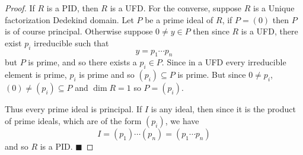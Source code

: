 \documentclass[10pt]{article}
\def\qed{%
    \ifmmode%
        \eqno\blacksquare%
    \else%
        \hskip1cm\allowbreak\hbox{}\nobreak\hfill$\blacksquare$%
    \fi%
}
\begin{document}
\begin{proof}

    If $R$ is a PID, then $R$ is a UFD.
    For the converse, suppose $R$ is a Unique factorization Dedekind domain.
    Let $P$ be a prime ideal of $R$, if $P=(0)$ then $P$ is of course principal.
    Otherwise suppose $0\neq y\in P$ then since $R$ is a UFD, there exist $p_i$ irreducible such that
    \[ y = p_1\cdots p_n \]
    but $P$ is prime, and so there exists a $p_i\in P$.
    Since in a UFD every irreducible element is prime, $p_i$ is prime and so $(p_i)\subseteq P$ is prime.
    But since $0\neq p_i$, $(0)\neq(p_i)\subseteq P$ and $\dim R=1$ so $P=(p_i)$.

    Thus every prime ideal is principal.
    If $I$ is any ideal, then since it is the product of prime ideals, which are of the form $(p_i)$, we have
    \[ I = (p_1)\cdots(p_n) = (p_1\cdots p_n) \]
    and so $R$ is a PID.
    \qed

\end{proof}
\end{document}
